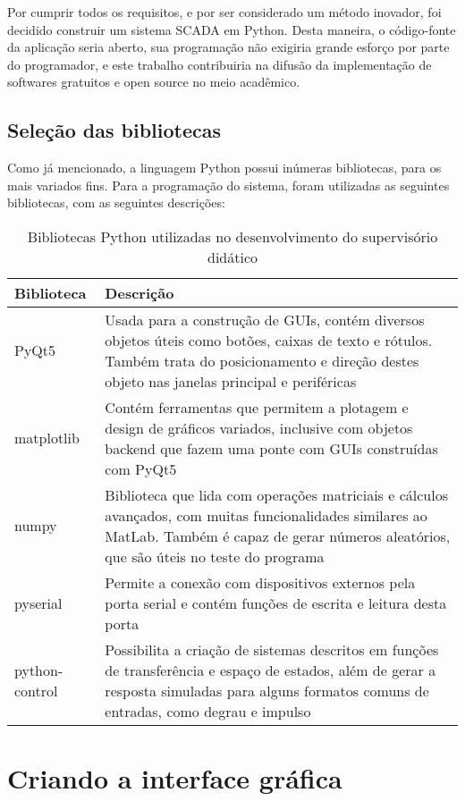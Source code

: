 Por cumprir todos os requisitos, e por ser considerado um método inovador, foi decidido construir um sistema SCADA em Python. Desta maneira, o código-fonte da aplicação seria aberto, sua programação não exigiria grande esforço por parte do programador, e este trabalho contribuiria na difusão da implementação de softwares gratuitos e open source no meio acadêmico.

\subsection{Seleção das bibliotecas}

Como já mencionado, a linguagem Python possui inúmeras bibliotecas, para os mais variados fins. Para a programação do sistema, foram utilizadas as seguintes bibliotecas, com as seguintes descrições:

\begin{table}
	\centering
	\begin{tabular}{|m{5em}|m{25em}|}
		\hline
		Biblioteca & Descrição \\
		\hline
		PyQt5 & Usada para a construção de GUIs, contém diversos objetos úteis como botões, caixas de texto e rótulos. Também trata do posicionamento e direção destes objeto nas janelas principal e periféricas \\
		\hline
		matplotlib & Contém ferramentas que permitem a plotagem e design de gráficos variados, inclusive com objetos backend que fazem uma ponte com GUIs construídas com PyQt5 \\
		\hline
		numpy & Biblioteca que lida com operações matriciais e cálculos avançados, com muitas funcionalidades similares ao MatLab. Também é capaz de gerar números aleatórios, que são úteis no teste do programa \\
		\hline
		pyserial & Permite a conexão com dispositivos externos pela porta serial e contém funções de escrita e leitura desta porta \\
		\hline
		python-control & Possibilita a criação de sistemas descritos em funções de transferência e espaço de estados, além de gerar a resposta simuladas para alguns formatos comuns de entradas, como degrau e impulso \\
		\hline
	\end{tabular}
	\caption{Bibliotecas Python utilizadas no desenvolvimento do supervisório didático}
\end{table}

\section{Criando a interface gráfica}

